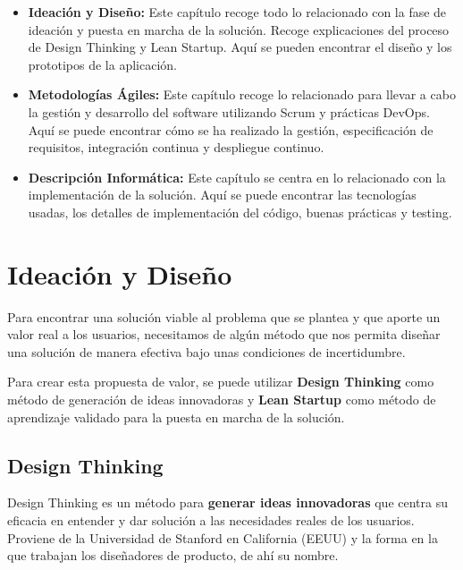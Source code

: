 \documentclass[12pt,twoside,titlepage]{report}
\newcommand\blankpage{%
    \newpage
    \null
    \thispagestyle{empty}%
    \newpage}
\begin{document}
\begin{itemize}
    \item \textbf{Ideación y Diseño:} Este capítulo recoge todo lo relacionado con la fase de ideación y puesta en marcha de la solución. Recoge explicaciones del proceso de Design Thinking y Lean Startup. Aquí se pueden encontrar el diseño y los prototipos de la aplicación.
    \item \textbf{Metodologías Ágiles:} Este capítulo recoge lo relacionado para llevar a cabo la gestión y desarrollo del software utilizando Scrum y prácticas DevOps. Aquí se puede encontrar cómo se ha realizado la gestión, especificación de requisitos, integración continua y despliegue continuo.
    \item \textbf{Descripción Informática:} Este capítulo se centra en lo relacionado con la implementación de la solución. Aquí se puede encontrar las tecnologías usadas, los detalles de implementación del código, buenas prácticas y testing.
\end{itemize}





\chapter{Ideación y Diseño}

Para encontrar una solución viable al problema que se plantea y que aporte un valor real a los usuarios, necesitamos de algún método que nos permita diseñar una solución de manera efectiva bajo unas condiciones de incertidumbre.

Para crear esta propuesta de valor, se puede utilizar \textbf{Design Thinking} como método de generación de ideas innovadoras y \textbf{Lean Startup} como método de aprendizaje validado para la puesta en marcha de la solución.

\section{Design Thinking}

Design Thinking es un método para \textbf{generar ideas innovadoras} que centra su eficacia en entender y dar solución a las necesidades reales de los usuarios. Proviene de la Universidad de Stanford en California (EEUU) y la forma en la que trabajan los diseñadores de producto, de ahí su nombre.
\end{document}
